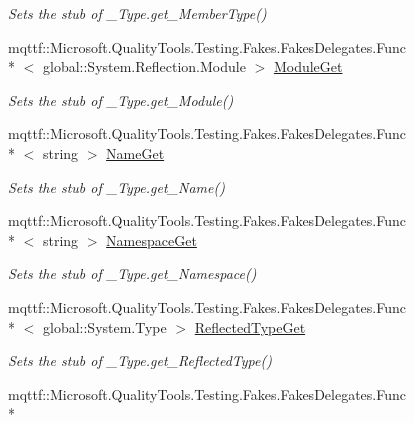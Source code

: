 \begin{DoxyCompactItemize}
\begin{DoxyCompactList}\small\item\em Sets the stub of \-\_\-\-Type.\-get\-\_\-\-Member\-Type()\end{DoxyCompactList}\item 
mqttf\-::\-Microsoft.\-Quality\-Tools.\-Testing.\-Fakes.\-Fakes\-Delegates.\-Func\\*
$<$ global\-::\-System.\-Reflection.\-Module $>$ \hyperlink{class_system_1_1_runtime_1_1_interop_services_1_1_fakes_1_1_stub___type_a64c770ace80d8ca45680adadc59b3352}{Module\-Get}
\begin{DoxyCompactList}\small\item\em Sets the stub of \-\_\-\-Type.\-get\-\_\-\-Module()\end{DoxyCompactList}\item 
mqttf\-::\-Microsoft.\-Quality\-Tools.\-Testing.\-Fakes.\-Fakes\-Delegates.\-Func\\*
$<$ string $>$ \hyperlink{class_system_1_1_runtime_1_1_interop_services_1_1_fakes_1_1_stub___type_a8613753324eadff5d550fad74e53f328}{Name\-Get}
\begin{DoxyCompactList}\small\item\em Sets the stub of \-\_\-\-Type.\-get\-\_\-\-Name()\end{DoxyCompactList}\item 
mqttf\-::\-Microsoft.\-Quality\-Tools.\-Testing.\-Fakes.\-Fakes\-Delegates.\-Func\\*
$<$ string $>$ \hyperlink{class_system_1_1_runtime_1_1_interop_services_1_1_fakes_1_1_stub___type_aa1fb62536670fe8353faf4f0e40df1bf}{Namespace\-Get}
\begin{DoxyCompactList}\small\item\em Sets the stub of \-\_\-\-Type.\-get\-\_\-\-Namespace()\end{DoxyCompactList}\item 
mqttf\-::\-Microsoft.\-Quality\-Tools.\-Testing.\-Fakes.\-Fakes\-Delegates.\-Func\\*
$<$ global\-::\-System.\-Type $>$ \hyperlink{class_system_1_1_runtime_1_1_interop_services_1_1_fakes_1_1_stub___type_ad31c5f923caa20593394870bb7f6f329}{Reflected\-Type\-Get}
\begin{DoxyCompactList}\small\item\em Sets the stub of \-\_\-\-Type.\-get\-\_\-\-Reflected\-Type()\end{DoxyCompactList}\item 
mqttf\-::\-Microsoft.\-Quality\-Tools.\-Testing.\-Fakes.\-Fakes\-Delegates.\-Func\\*

\end{DoxyCompactItemize}
